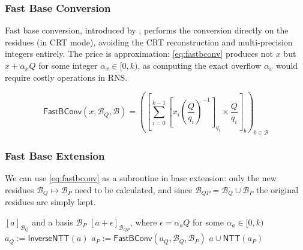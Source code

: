 
\subsubsection{Fast Base Conversion}
Fast base conversion, introduced by \cite{cryptoeprint:2016/510}, performs the conversion directly on the residues (in CRT mode), avoiding the CRT reconstruction and multi-precision integers entirely. The price is approximation: \eqref{eq:fastbconv} produces not $x$ but $x + \alpha_x Q$ for some integer $\alpha_x \in [0, k)$, as computing the exact overflow $\alpha_x$ would require costly operations in RNS.

\begin{equation}
    \label{eq:fastbconv}
    \mathsf{FastBConv}(x, \mathcal{B}_Q, \mathcal{B}) = \left(\left[\sum_{i=0}^{k-1}\left[x_i\left(\frac{Q}{q_i}\right)^{-1}\right]_{q_i} \times \frac{Q}{q_i}\right]_b\right)_{b\in \mathcal{B}}
\end{equation}


\subsubsection{Fast Base Extension}
We can use \eqref{eq:fastbconv} as a subroutine in base extension: only the new residues $\mathcal{B}_Q \longmapsto \mathcal{B}_P$ need to be calculated, and since $\mathcal{B}_{QP} = \mathcal{B}_Q\cup \mathcal{B}_P$ the original residues are simply kept.

\begin{algorithm}[ht!]
\caption{Fast Base Extension}
\label{alg:fast_base_extension}
\begin{algorithmic}[1]
    \Require $[a]_{\mathcal{B}_Q}$ and a basis $\mathcal{B}_P$
    \Ensure $[a + \epsilon]_{\mathcal{B}_{QP}}$, where $\epsilon = \alpha_aQ$ for some $\alpha_a\in[0, k)$
    \State $a_{Q} := \mathsf{Inverse NTT}(a)$
    \State $a_{P} := \mathsf{FastBConv}(a_Q, \mathcal{B}_Q, \mathcal{B}_P)$
    \State\Return $a \cup \mathsf{NTT}(a_{P})$
\end{algorithmic}
\end{algorithm}

